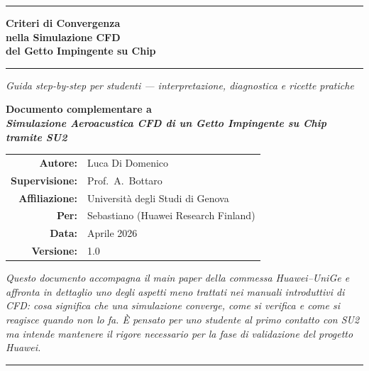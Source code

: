 \documentclass[11pt,a4paper]{article}
\begin{document}

\begin{titlepage}
  \centering
  \vspace*{1.5cm}

  {\color{huaweiblue}\rule{\linewidth}{1.5pt}}
  \vspace{0.6cm}

  {\LARGE\bfseries\color{huaweiblue}
    Criteri di Convergenza \\[0.3cm]
    nella Simulazione CFD \\[0.3cm]
    del Getto Impingente su Chip
  }

  \vspace{0.4cm}
  {\color{midblue}\rule{\linewidth}{0.8pt}}

  \vspace{0.8cm}
  {\large\itshape Guida step-by-step per studenti — interpretazione,
    diagnostica e ricette pratiche}

  \vspace{1.6cm}

  {\large\bfseries Documento complementare a \\
    \emph{Simulazione Aeroacustica CFD di un Getto Impingente su Chip
    tramite SU2}}

  \vspace{2.5cm}

  \begin{tabular}{rl}
    \textbf{Autore:}        & Luca Di Domenico \\
    \textbf{Supervisione:}  & Prof.\ A.\ Bottaro \\
    \textbf{Affiliazione:}  & Università degli Studi di Genova \\
    \textbf{Per:}           & Sebastiano (Huawei Research Finland) \\
    \textbf{Data:}          & Aprile 2026 \\
    \textbf{Versione:}      & 1.0 \\
  \end{tabular}

  \vfill

  \begin{minipage}{0.85\linewidth}
    \centering
    \itshape
    Questo documento accompagna il main paper della commessa
    Huawei--UniGe e affronta in dettaglio uno degli aspetti meno
    trattati nei manuali introduttivi di CFD: cosa significa che una
    simulazione \emph{converge}, come si verifica e come si reagisce
    quando non lo fa. È pensato per uno studente al primo contatto con
    SU2 ma intende mantenere il rigore necessario per la fase di
    validazione del progetto Huawei.
  \end{minipage}

  \vspace{0.6cm}
  {\color{huaweiblue}\rule{\linewidth}{1.5pt}}
\end{titlepage}
\end{document}

